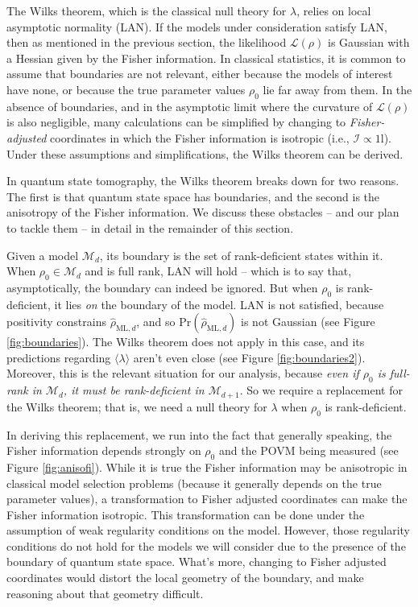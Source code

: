 \documentclass[aps,pra, twocolumn]{revtex4-1}
\newcommand{\M}{\mathcal{M}}
\newcommand{\Id}{\mathbb{I}}
\def\Id{1\!\mathrm{l}}
\newcommand{\rhohat}{\hat{\rho}}
\newcommand{\rhoML}[1]{\rhohat_{\scriptscriptstyle{\mathrm{ML},#1}}}
\begin{document}
The Wilks theorem, which is the classical null theory for $\lambda$, relies on local asymptotic normality (LAN). If the models under consideration satisfy LAN, then as mentioned in the previous section, the likelihood $\mathcal{L}(\rho)$ is Gaussian with a Hessian given by the Fisher information. In classical statistics, it is common to assume that boundaries are not relevant, either because the models of interest have none, or because the true parameter values $\rho_{0}$ lie far away from them.  In the absence of boundaries, and in the asymptotic limit where the curvature of $\mathcal{L}(\rho)$ is also negligible, many calculations can be simplified by changing to \emph{Fisher-adjusted} coordinates in which the Fisher information is isotropic (i.e., $\mathcal{I}\propto\Id$). Under these assumptions and simplifications, the Wilks theorem can be derived.

In quantum state tomography, the Wilks theorem breaks down for two reasons. The first is that quantum state space has boundaries, and the second is the anisotropy of the Fisher information. We discuss these obstacles -- and our plan to tackle them -- in detail in the remainder of this section.

Given a model $\M_{d}$, its boundary is the set of rank-deficient states within it. When $\rho_{0}\in \M_{d}$ and is full rank, LAN will hold -- which is to say that, asymptotically, the boundary can indeed be ignored. But when $\rho_{0}$ is rank-deficient, it lies \emph{on} the boundary of the model.  LAN is not satisfied, because positivity constrains $\rhoML{d}$, and so $\mathrm{Pr}(\rhoML{d})$ is not Gaussian (see Figure \ref{fig:boundaries}). The Wilks theorem does not apply in this case, and its predictions regarding $\langle \lambda \rangle$ aren't even close (see Figure \ref{fig:boundaries2}). Moreover, this is the relevant situation for our analysis, because \emph{even if $\rho_{0}$ is full-rank in $\M_{d}$, it must be rank-deficient in $\M_{d+1}$}. So we require a replacement for the Wilks theorem; that is, we need a null theory for $\lambda$ when $\rho_0$ is rank-deficient.

In deriving this replacement, we run into the fact that generally speaking, the Fisher information depends strongly on $\rho_{0}$ and the POVM being measured (see Figure \ref{fig:anisofi}). While it is true the Fisher information may be anisotropic in classical model selection problems (because it generally depends on the true parameter values), a transformation to Fisher adjusted coordinates can make the Fisher information isotropic. This transformation can be done under the assumption of weak regularity conditions on the model. However, those regularity conditions do not hold for the models we will consider due to the presence of the boundary of quantum state space. What's more, changing to Fisher adjusted coordinates would distort the local geometry of the boundary, and make reasoning about that geometry difficult.
\end{document}

